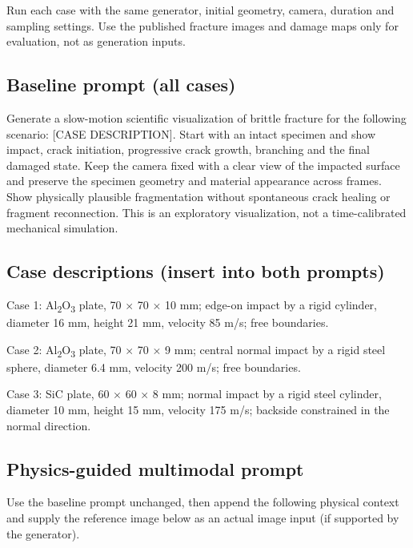 \documentclass[11pt]{article}
\begin{document}
Run each case with the same generator, initial geometry, camera, duration and sampling settings. Use the published fracture images and damage maps only for evaluation, not as generation inputs.

\subsection{Baseline prompt (all cases)}\label{baseline-prompt-all-cases}

Generate a slow-motion scientific visualization of brittle fracture for the following scenario: {[}CASE DESCRIPTION{]}. Start with an intact specimen and show impact, crack initiation, progressive crack growth, branching and the final damaged state. Keep the camera fixed with a clear view of the impacted surface and preserve the specimen geometry and material appearance across frames. Show physically plausible fragmentation without spontaneous crack healing or fragment reconnection. This is an exploratory visualization, not a time-calibrated mechanical simulation.

\subsection{Case descriptions (insert into both prompts)}\label{case-descriptions-insert-into-both-prompts}

Case 1: Al\textsubscript{2}O\textsubscript{3} plate, 70 \(\times\) 70 \(\times\) 10 mm; edge-on impact by a rigid cylinder, diameter 16 mm, height 21 mm, velocity 85 m/s; free boundaries.

Case 2: Al\textsubscript{2}O\textsubscript{3} plate, 70 \(\times\) 70 \(\times\) 9 mm; central normal impact by a rigid steel sphere, diameter 6.4 mm, velocity 200 m/s; free boundaries.

Case 3: SiC plate, 60 \(\times\) 60 \(\times\) 8 mm; normal impact by a rigid steel cylinder, diameter 10 mm, height 15 mm, velocity 175 m/s; backside constrained in the normal direction.

\subsection{Physics-guided multimodal prompt}\label{physics-guided-multimodal-prompt}

Use the baseline prompt unchanged, then append the following physical context and supply the reference image below as an actual image input (if supported by the generator).
\end{document}
